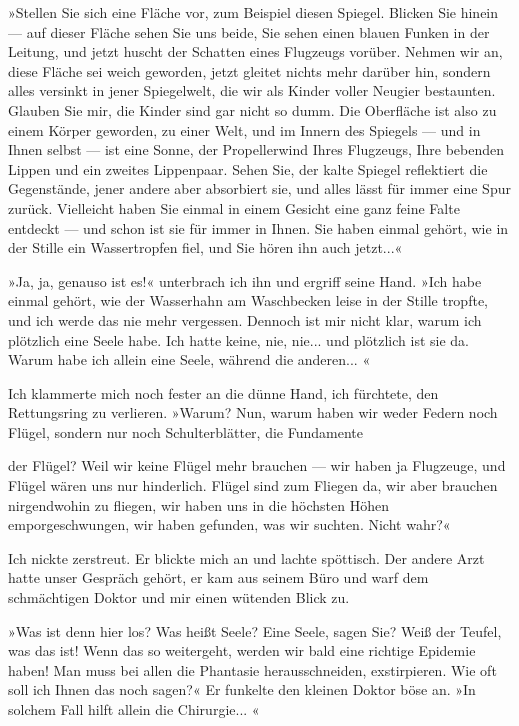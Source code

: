 »Stellen Sie sich eine Fläche vor, zum Beispiel diesen Spiegel.
Blicken Sie hinein — auf dieser Fläche sehen Sie uns beide, Sie
sehen einen blauen Funken in der Leitung, und jetzt huscht der
Schatten eines Flugzeugs vorüber. Nehmen wir an, diese Fläche sei
weich geworden, jetzt gleitet nichts mehr darüber hin, sondern
alles versinkt in jener Spiegelwelt, die wir als Kinder voller
Neugier bestaunten. Glauben Sie mir, die Kinder sind gar nicht so
dumm. Die Oberfläche ist also zu einem Körper geworden, zu einer
Welt, und im Innern des Spiegels — und in Ihnen selbst — ist eine
Sonne, der Propellerwind Ihres Flugzeugs, Ihre bebenden Lippen und
ein zweites Lippenpaar. Sehen Sie, der kalte Spiegel reflektiert
die Gegenstände, jener andere aber absorbiert sie, und alles lässt
für immer eine Spur zurück. Vielleicht haben Sie einmal in einem
Gesicht eine ganz feine Falte entdeckt — und schon ist sie für
immer in Ihnen. Sie haben einmal gehört, wie in der Stille ein
Wassertropfen fiel, und Sie hören ihn auch jetzt...«

»Ja, ja, genauso ist es!« unterbrach ich ihn und ergriff seine
Hand. »Ich habe einmal gehört, wie der Wasserhahn am Waschbecken
leise in der Stille tropfte, und ich werde das nie mehr vergessen.
Dennoch ist mir nicht klar, warum ich plötzlich eine Seele habe.
Ich hatte keine, nie, nie... und plötzlich ist sie da. Warum habe
ich allein eine Seele, während die anderen... «

Ich klammerte mich noch fester an die dünne Hand, ich fürchtete,
den Rettungsring zu verlieren. »Warum? Nun, warum haben wir weder
Federn noch Flügel, sondern nur noch Schulterblätter, die
Fundamente

der Flügel? Weil wir keine Flügel mehr brauchen — wir haben ja
Flugzeuge, und Flügel wären uns nur hinderlich. Flügel sind zum
Fliegen da, wir aber brauchen nirgendwohin zu fliegen, wir haben
uns in die höchsten Höhen emporgeschwungen, wir haben gefunden, was
wir suchten. Nicht wahr?«

Ich nickte zerstreut. Er blickte mich an und lachte spöttisch. Der
andere Arzt hatte unser Gespräch gehört, er kam aus seinem Büro und
warf dem schmächtigen Doktor und mir einen wütenden Blick zu.

»Was ist denn hier los? Was heißt Seele? Eine Seele, sagen Sie?
Weiß der Teufel, was das ist! Wenn das so weitergeht, werden wir
bald eine richtige Epidemie haben! Man muss bei allen die Phantasie
herausschneiden, exstirpieren. Wie oft soll ich Ihnen das noch
sagen?« Er funkelte den kleinen Doktor böse an. »In solchem Fall
hilft allein die Chirurgie... «

